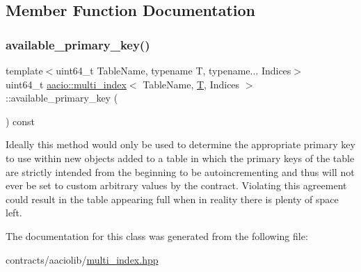 \subsection{Member Function Documentation}
\mbox{\label{classaacio_1_1multi__index_ad20885f931ff0a95899e48e866cf002b}} 
\subsubsection{\texorpdfstring{available\+\_\+primary\+\_\+key()}{available\_primary\_key()}}
{\footnotesize\ttfamily template$<$uint64\+\_\+t Table\+Name, typename T, typename... Indices$>$ \\
uint64\+\_\+t \mbox{\hyperlink{classaacio_1_1multi__index}{aacio\+::multi\+\_\+index}}$<$ Table\+Name, \mbox{\hyperlink{struct_t}{T}}, Indices $>$\+::available\+\_\+primary\+\_\+key (\begin{DoxyParamCaption}{ }\end{DoxyParamCaption}) const\hspace{0.3cm}{\ttfamily [inline]}}

Ideally this method would only be used to determine the appropriate primary key to use within new objects added to a table in which the primary keys of the table are strictly intended from the beginning to be autoincrementing and thus will not ever be set to custom arbitrary values by the contract. Violating this agreement could result in the table appearing full when in reality there is plenty of space left. 

The documentation for this class was generated from the following file\+:\begin{DoxyCompactItemize}
\item 
contracts/aaciolib/\mbox{\hyperlink{multi__index_8hpp}{multi\+\_\+index.\+hpp}}\end{DoxyCompactItemize}
